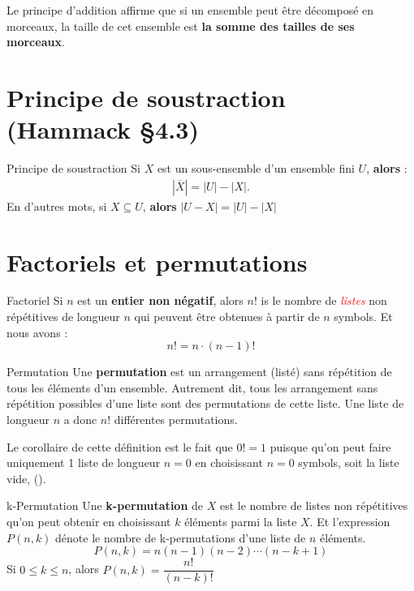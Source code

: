 \documentclass[8pt]{report}
\begin{document}
\begin{multicols*}{2}
\begin{note}{}{}
    Le \textcolor{myb}{principe d'addition} affirme que si un ensemble peut être 
    décomposé en morceaux, la taille de cet ensemble est \textbf{la somme des tailles 
    de ses morceaux}.    
\end{note}

\section{Principe de soustraction (Hammack \S 4.3)}
\begin{Definitionx*}{Principe de soustraction}{}
    Si $X$ est un sous-ensemble d'un ensemble fini $U$, \textbf{alors} :
    \begin{align*}
      |\overline{X}| = |U| - |X|. 
    \end{align*}
    En d'autres mots, si $X \subseteq U$, \textbf{alors}   $|U - X| = |U| - |X|$
\end{Definitionx*}

\section{Factoriels et permutations}
\begin{Definitionx*}{Factoriel}{}
    Si $n$ est un \textbf{entier non négatif}, alors $n!$ is le nombre de \textcolor{red}{\textit{listes}}
    non répétitives de longueur $n$ qui peuvent être obtenues à partir de $n$ symbols. Et nous avons :
    \[ n! = n \cdot (n-1)! \]
\end{Definitionx*}


\begin{Definitionx*}{{Permutation}}{}
    Une \textbf{permutation} est un arrangement (listé) sans répétition de tous les éléments d'un ensemble. Autrement 
    dit, tous les arrangement sans répétition possibles d'une liste sont des permutations de cette liste. Une liste 
    de longueur $n$ a donc $n!$ différentes permutations.
\end{Definitionx*}

Le corollaire de cette définition est le fait que $0! = 1$ puisque qu'on peut faire uniquement 1 liste de longueur 
$n=0$ en choisissant $n=0$ symbols, soit la liste vide, ().


\begin{Definitionx*}{{k-Permutation}}{}
    Une \textbf{k-permutation} de $X$ est le nombre de listes non répétitives qu'on peut obtenir en choisissant 
    $k$ éléments parmi la liste $X$. Et l'expression $P(n, k)$ dénote le nombre de k-permutations
    d'une liste de $n$ éléments.
                                    \[ P(n, k)= n(n-1)(n-2)\cdots(n-k+1) \]
    Si $0 \leq k \leq n$, alors $P(n, k) = \dfrac{n!}{(n-k)!}$
    

\end{Definitionx*}
\end{multicols*}
\end{document}
